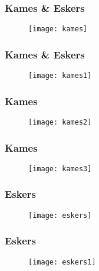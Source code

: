 \documentclass{beamer}
\begin{document}
\begin{frame}
\frametitle{Kames \& Eskers}
\begin{figure}
\begin{center}
\texttt{[image: kames]}
\end{center}
\end{figure}
\end{frame}
\begin{frame}
\frametitle{Kames \& Eskers}
\begin{figure}
\begin{center}
\texttt{[image: kames1]}
\end{center}
\end{figure}
\end{frame}
\begin{frame}
\frametitle{Kames}
\begin{figure}
\begin{center}
\texttt{[image: kames2]}
\end{center}
\end{figure}
\end{frame}
\begin{frame}
\frametitle{Kames}
\begin{figure}
\begin{center}
\texttt{[image: kames3]}
\end{center}
\end{figure}
\end{frame}
\begin{frame}
\frametitle{Eskers}
\begin{figure}
\begin{center}
\texttt{[image: eskers]}
\end{center}
\end{figure}
\end{frame}
\begin{frame}
\frametitle{Eskers}
\begin{figure}
\begin{center}
\texttt{[image: eskers1]}
\end{center}
\end{figure}
\end{frame}
\end{document}
